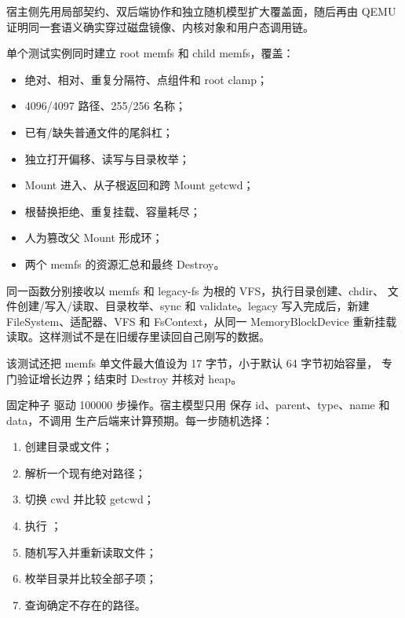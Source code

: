宿主侧先用局部契约、双后端协作和独立随机模型扩大覆盖面，随后再由 QEMU
证明同一套语义确实穿过磁盘镜像、内核对象和用户态调用链。


单个测试实例同时建立 root memfs 和 child memfs，覆盖：

\begin{itemize}
  \item 绝对、相对、重复分隔符、点组件和 root clamp；
  \item 4096/4097 路径、255/256 名称；
  \item 已有/缺失普通文件的尾斜杠；
  \item 独立打开偏移、读写与目录枚举；
  \item Mount 进入、从子根返回和跨 Mount getcwd；
  \item 根替换拒绝、重复挂载、容量耗尽；
  \item 人为篡改父 Mount 形成环；
  \item 两个 memfs 的资源汇总和最终 Destroy。
\end{itemize}


同一函数分别接收以 memfs 和 legacy-fs 为根的 VFS，执行目录创建、chdir、
文件创建/写入/读取、目录枚举、sync 和 validate。legacy 写入完成后，新建
FileSystem、适配器、VFS 和 FsContext，从同一 MemoryBlockDevice 重新挂载
读取。这样测试不是在旧缓存里读回自己刚写的数据。

该测试还把 memfs 单文件最大值设为 17 字节，小于默认 64 字节初始容量，
专门验证增长边界；结束时 Destroy 并核对 heap。


固定种子  驱动 100000 步操作。宿主模型只用
 保存 id、parent、type、name 和 data，不调用
生产后端来计算预期。每一步随机选择：

\begin{enumerate}
  \item 创建目录或文件；
  \item 解析一个现有绝对路径；
  \item 切换 cwd 并比较 getcwd；
  \item 执行 ；
  \item 随机写入并重新读取文件；
  \item 枚举目录并比较全部子项；
  \item 查询确定不存在的路径。
\end{enumerate}

